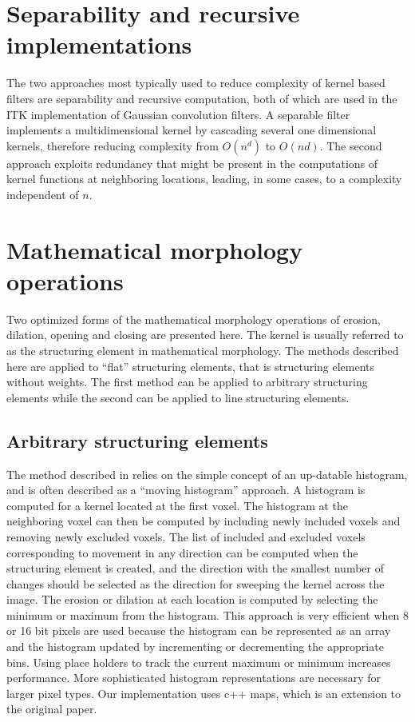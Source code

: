\documentclass[a4paper]{InsightArticle}
\begin{document}
\section{Separability and recursive implementations}
The two approaches most typically used to reduce complexity of kernel
based filters are separability and recursive computation, both of
which are used in the ITK implementation of Gaussian convolution
filters. A separable filter implements a multidimensional kernel by
cascading several one dimensional kernels, therefore reducing
complexity from $O(n^d)$ to $O(nd)$. The second approach exploits
redundancy that might be present in the computations of kernel
functions at neighboring locations, leading, in some cases, to a complexity
independent of $n$.

\section{Mathematical morphology operations}
Two optimized forms of the mathematical morphology operations of
erosion, dilation, opening and closing are presented here. The kernel
is usually referred to as the structuring element in mathematical
morphology. The methods described here are applied to ``flat''
structuring elements, that is structuring elements without
weights. The first method can be applied to arbitrary structuring
elements while the second can be applied to line structuring elements.

\subsection{Arbitrary structuring elements}
\label{sect:MMmovingHist}
The method described in \cite{Vandroogenbroeck96.3} relies on the
simple concept of an up-datable histogram, and is often described as a
``moving histogram'' approach. A histogram is computed for a kernel
located at the first voxel. The histogram at the neighboring voxel can
then be computed by including newly included voxels and removing newly
excluded voxels. The list of included and excluded voxels
corresponding to movement in any direction can be computed when the
structuring element is created, and the direction with the smallest
number of changes should be selected as the direction for sweeping the
kernel across the image. The erosion or dilation at each location is
computed by selecting the minimum or maximum from the histogram. This
approach is very efficient when 8 or 16 bit pixels are used because
the histogram can be represented as an array and the histogram updated
by incrementing or decrementing the appropriate bins. Using place
holders to track the current maximum or minimum increases
performance. More sophisticated histogram representations are
necessary for larger pixel types. Our implementation uses c++ maps,
which is an extension to the original paper.
\end{document}
